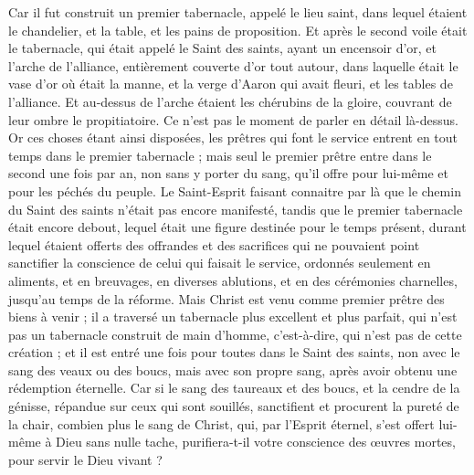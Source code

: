 \begin{multicols}{2}
Car il fut construit un premier tabernacle, appelé le lieu saint, dans lequel étaient le chandelier, et la table, et les pains de proposition.
Et après le second voile était le tabernacle, qui était appelé le Saint des saints,
ayant un encensoir d'or, et l'arche de l'alliance, entièrement couverte d'or tout autour, dans laquelle était le vase d'or où était la manne, et la verge d'Aaron qui avait fleuri, et les tables de l'alliance.
Et au-dessus de l'arche étaient les chérubins de la gloire, couvrant de leur ombre le propitiatoire. Ce n'est pas le moment de parler en détail là-dessus.
Or ces choses étant ainsi disposées, les prêtres qui font le service entrent en tout temps dans le premier tabernacle ;
mais seul le premier prêtre entre dans le second une fois par an, non sans y porter du sang, qu'il offre pour lui-même et pour les péchés du peuple.
Le Saint-Esprit faisant connaitre par là que le chemin du Saint des saints n'était pas encore manifesté, tandis que le premier tabernacle était encore debout,
lequel était une figure destinée pour le temps présent, durant lequel étaient offerts des offrandes et des sacrifices qui ne pouvaient point sanctifier la conscience de celui qui faisait le service,
ordonnés seulement en aliments, et en breuvages, en diverses ablutions, et en des cérémonies charnelles, jusqu'au temps de la réforme.
Mais Christ est venu comme premier prêtre des biens à venir ; il a traversé un tabernacle plus excellent et plus parfait, qui n'est pas un tabernacle construit de main d'homme, c'est-à-dire, qui n'est pas de cette création ;
et il est entré une fois pour toutes dans le Saint des saints, non avec le sang des veaux ou des boucs, mais avec son propre sang, après avoir obtenu une rédemption éternelle.
Car si le sang des taureaux et des boucs, et la cendre de la génisse, répandue sur ceux qui sont souillés, sanctifient et procurent la pureté de la chair,
combien plus le sang de Christ, qui, par l'Esprit éternel, s'est offert lui-même à Dieu sans nulle tache, purifiera-t-il votre conscience des œuvres mortes, pour servir le Dieu vivant ?

\end{multicols}
